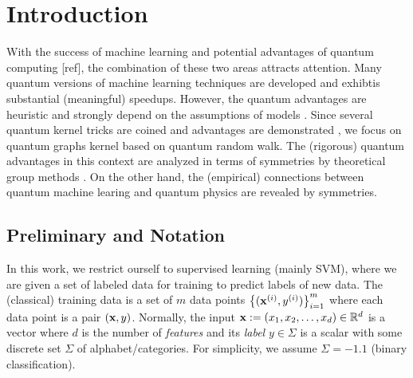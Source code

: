 
\section{Introduction}
With the success of machine learning and potential advantages of quantum computing [ref], the combination of these two areas attracts attention.
Many quantum versions of machine learning techniques \cite{rebentrostQuantumSupportVector2014} \cite{lloydQuantumPrincipalComponent2014} \cite{congQuantumConvolutionalNeural2019} are developed and exhibtis substantial (meaningful) speedups.
However, the quantum advantages are heuristic and strongly depend on the assumptions of models \cite{tangQuantumPrincipalComponent2021}.
Since several quantum kernel tricks are coined \cite{havlicekSupervisedLearningQuantum2019} \cite{schuldQuantumMachineLearning2019} and advantages are demonstrated \cite{glickCovariantQuantumKernels2021} \cite{liuRigorousRobustQuantum2021},
we focus on quantum graphs kernel based on quantum random walk. 
The (rigorous) quantum advantages in this context are analyzed in terms of symmetries by theoretical group methods \cite{kondorGroupTheoreticalMethods2008} \cite{ben-davidSymmetriesGraphProperties2020}.
On the other hand, the (empirical) connections between quantum machine learing and quantum physics are revealed by symmetries.


\subsection{Preliminary and Notation}
In this work, we restrict ourself to supervised learning (mainly SVM), where we are given a set of labeled data for training to predict labels of new data.
The (classical) training data is a set of $m$ data points $\qty{(\vb{x}^{(i)}, y^{(i)})}^{m}_{i=1}$ 
where each data point is a pair $(\vb{x},y)$.
Normally, the input $\vb{x}:= (x_1,x_2,\dots,x_d) \in \mathbb{R}^d$  is a vector where $d$ is the number of \emph{features}
and its \emph{label} $y\in\Sigma$ is a scalar with some discrete set $\Sigma$ of alphabet/categories. 
For simplicity, we assume $\Sigma=\qty{-1,1}$ (binary classification).

